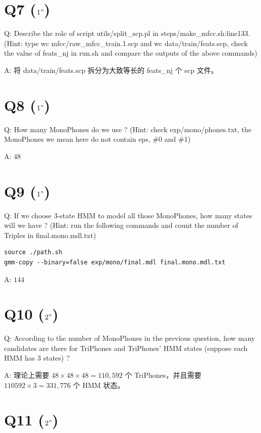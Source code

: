 \documentclass[degree=project,degree-type=project,cjk-font=noto]{thuthesis}
\begin{document}
\section{Q7 ($1"$)}

Q: Describe the role of script utils/split\_scp.pl in steps/make\_mfcc.sh:line133. (Hint: type wc mfcc/raw\_mfcc\_train.1.scp and wc data/train/feats.scp, check the value of feats\_nj in run.sh and compare the outputs of the above commands)

A: 将 data/train/feats.scp 拆分为大致等长的 feats\_nj 个 scp 文件。

\section{Q8 ($1"$)}

Q: How many MonoPhones do we use ? (Hint: check exp/mono/phones.txt, the MonoPhones we mean here do not contain eps, \#0 and \#1)

A: $48$

\section{Q9 ($1"$)}

Q: If we choose 3-state HMM to model all those MonoPhones, how many states will we have ? (Hint: run the following commands and count the number of Triples in final.mono.mdl.txt)

  \begin{verbatim}
source ./path.sh
gmm-copy --binary=false exp/mono/final.mdl final.mono.mdl.txt
  \end{verbatim}

A: $144$

\section{Q10 ($2"$)}

Q: According to the number of MonoPhones in the previous question, how many candidates are there for TriPhones and TriPhones' HMM states (suppose each HMM has 3 states) ?

A: 理论上需要 $48 \times 48 \times 48 = 110,592$ 个 TriPhones，并且需要 $110592 \times 3 = 331,776$ 个 HMM 状态。

\section{Q11 ($2"$)}
\end{document}
